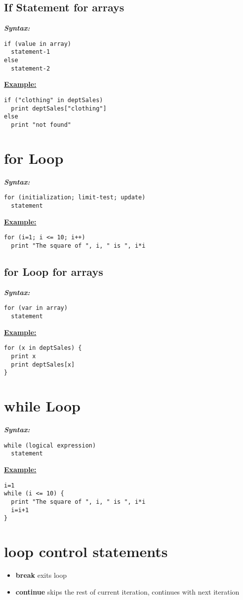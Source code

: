 \documentclass{report}
\begin{document}
\subsection*{If Statement for arrays}
\bigbreak \noindent
\textbf{\textit{Syntax:}}
\begin{verbatim}
if (value in array)
  statement-1
else 
  statement-2
\end{verbatim}
\bigbreak \noindent
\textbf{\underline{Example:}}
\begin{mdframed}
\begin{verbatim}
if ("clothing" in deptSales)
  print deptSales["clothing"]
else
  print "not found"
\end{verbatim}
\end{mdframed}
\section{for Loop}
\bigbreak \noindent
\textbf{\textit{Syntax:}}
\begin{verbatim}
for (initialization; limit-test; update)
  statement
\end{verbatim}
\bigbreak \noindent
\textbf{\underline{Example:}}
\begin{mdframed}
\begin{verbatim}
for (i=1; i <= 10; i++)
  print "The square of ", i, " is ", i*i
\end{verbatim}
\end{mdframed}
\subsection*{for Loop for arrays}
\bigbreak \noindent
\textbf{\textit{Syntax:}}
\begin{verbatim}
for (var in array)
  statement
\end{verbatim}
\bigbreak \noindent
\textbf{\underline{Example:}}
\begin{mdframed}
\begin{verbatim}
for (x in deptSales) {
  print x
  print deptSales[x]
}
\end{verbatim}
\end{mdframed}
\section{while Loop}
\bigbreak \noindent
\textbf{\textit{Syntax:}}
\begin{verbatim}
while (logical expression)
  statement
\end{verbatim}
\bigbreak \noindent
\textbf{\underline{Example:}}
\begin{mdframed}
\begin{verbatim}
i=1 
while (i <= 10) {
  print "The square of ", i, " is ", i*i
  i=i+1
}
\end{verbatim}
\end{mdframed}
\section{loop control statements}
\begin{itemize}
  \item \textbf{break} 
    \subitem exits loop
  \item \textbf{continue}
    \subitem skips the rest of current iteration, continues with next iteration
\end{itemize}
\newpage
\end{document}
